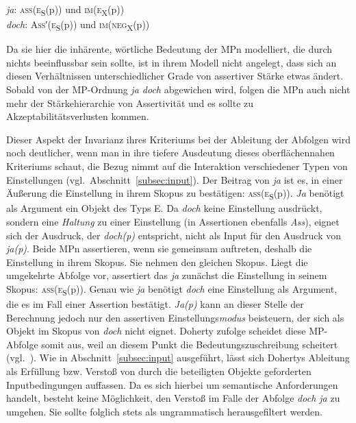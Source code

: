 \begin{exe}
	\ex\label{379} 
		\textit{ja}: \textsc{ass}(\textsc{e}\textsubscript{S}(\textrm{p})) und \textsc{im}(\textsc{e}\textsubscript{X}(\textrm{p}))\\
		\textit{doch}: \textsc{Ass′}(\textsc{e}\textsubscript{S}(p)) und \textsc{im(neg}\textsubscript{X}(p))
		\hfill\hbox{\citet[80/71]{Doherty1985}}
\end{exe}
Da sie hier die inhärente, wörtliche Bedeutung der MPn modelliert, die durch nichts beeinflussbar sein sollte, ist in ihrem Modell nicht angelegt, dass sich an diesen Verhältnissen unterschiedlicher Grade von assertiver Stärke etwas ändert. Sobald von der MP-Ordnung \textit{ja doch} abgewichen wird, folgen die MPn auch nicht mehr der Stärkehierarchie von Assertivität und es sollte zu Akzeptabilitätsverlusten kommen.

Dieser Aspekt der Invarianz ihres Kriteriums bei der Ableitung der Abfolgen wird noch deutlicher, wenn man in ihre tiefere Ausdeutung dieses oberflächennahen Kriteriums schaut, die Bezug nimmt auf die Interaktion verschiedener Typen von Einstellungen (vgl.\ Abschnitt~\ref{subsec:input}). Der Beitrag von \textit{ja} ist es, in einer Äußerung die Einstellung in ihrem Skopus zu bestätigen: \textsc{ass}(\textsc{e}\textsubscript{S}(\textrm{p})). \textit{Ja} benötigt als Argument ein Objekt des Typs E. Da \textit{doch} keine Einstellung ausdrückt, sondern eine \emph{Haltung} zu einer Einstellung (in Assertionen ebenfalls \textit{Ass}), eignet sich der Ausdruck, der \textit{doch(p)} entspricht, nicht als Input für den Ausdruck von \textit{ja(p)}. Beide MPn assertieren, wenn sie gemeinsam auftreten, deshalb die Einstellung in ihrem Skopus. Sie nehmen den gleichen Skopus. Liegt die umgekehrte Abfolge vor, assertiert das \textit{ja} zunächst die Einstellung in seinem Skopus: \textsc{ass}(\textsc{e}\textsubscript{S}(\textrm{p})). Genau wie \textit{ja} benötigt \textit{doch} eine Einstellung als Argument, die es im Fall einer Assertion bestätigt. \textit{Ja(p)} kann an dieser Stelle der Berechnung jedoch nur den assertiven Einstellungs\emph{modus} beisteuern, der sich als Objekt im Skopus  von \textit{doch} nicht eignet. Doherty zufolge scheidet diese MP-Abfolge somit aus, weil an diesem Punkt die Bedeutungszuschreibung scheitert (vgl.\ \citealt[84--85]{Doherty1985}). Wie in Abschnitt~\ref{subsec:input} ausgeführt, lässt sich Dohertys Ableitung als Erfüllung bzw. Verstoß von durch die beteiligten Objekte geforderten Inputbedingungen auffassen. Da es sich hierbei um semantische Anforderungen handelt, besteht keine Möglichkeit, den Verstoß im Falle der Abfolge \textit{doch ja} zu umgehen. Sie sollte folglich stets als ungrammatisch herausgefiltert werden.

